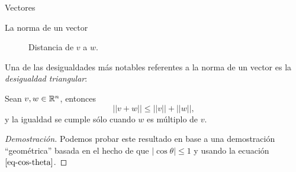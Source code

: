 \begin{chapter}{Vectores}
\begin{section}{La norma de un vector}
\begin{figure}[h]
	\centering
    \caption{Distancia de $v$ a $w$.}\label{fig-distancia-de-vectores}
\end{figure}


Una de las desigualdades más notables referentes a la norma de un vector es la \textit{desigualdad triangular}:

\begin{proposicion}
    Sean $v, w \in \mathbb R^n$, entonces
    \begin{equation*}
        ||v+w|| \le ||v||+||w||,
    \end{equation*}
    y la igualdad se cumple sólo cuando $w$ es múltiplo de $v$. 
\end{proposicion}
\begin{proof}[Demostración] Podemos probar  este resultado en base a una demostración ``geométrica'' basada en el hecho de que $|\cos\theta| \le 1 $ y usando la ecuación $\ref{eq-cos-theta}$.
    

\end{proof}
\end{section}
\end{chapter}
